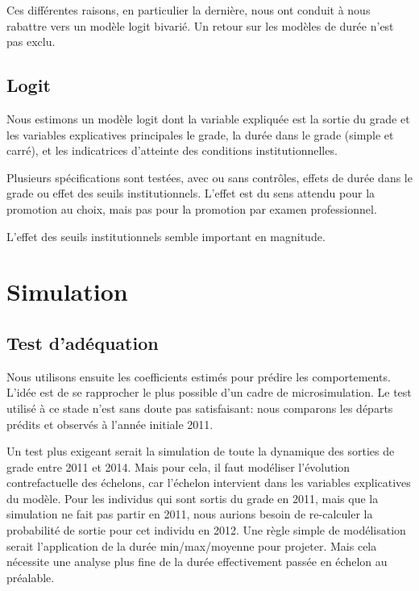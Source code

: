 \documentclass[11pt,a4paper]{article}
\begin{document}
Ces différentes raisons, en particulier la dernière, nous ont conduit à nous rabattre vers un modèle logit bivarié. Un retour sur les modèles de durée n'est pas exclu. 

\subsection*{Logit} 

Nous estimons un modèle logit dont la variable expliquée est la sortie du grade et les variables explicatives principales le grade, la durée dans le grade (simple et carré), et les indicatrices d'atteinte des conditions institutionnelles. 

Plusieurs spécifications sont testées, avec ou sans contrôles, effets de durée dans le grade ou effet des seuils institutionnels. 
L'effet est du sens attendu pour la promotion au choix, mais pas pour la promotion par examen professionnel. 

L'effet des seuils institutionnels semble important en magnitude.  %

\section{Simulation}


\subsection*{Test d'adéquation} 

Nous utilisons ensuite les coefficients estimés pour prédire les comportements. L'idée est de se rapprocher le plus possible d'un cadre de microsimulation. Le test utilisé à ce stade n'est sans doute pas satisfaisant: nous comparons les départs prédits et observés à l'année initiale 2011. 

Un test plus exigeant serait la simulation de toute la dynamique des sorties de grade entre 2011 et 2014. Mais pour cela, il faut modéliser l'évolution contrefactuelle des échelons, car l'échelon intervient dans les variables explicatives du modèle. Pour les individus qui sont sortis du grade en 2011, mais que la simulation ne fait pas partir en 2011, nous aurions besoin de re-calculer la probabilité de sortie pour cet individu en 2012. Une règle simple de modélisation serait l'application de la durée min/max/moyenne pour projeter. Mais cela nécessite une analyse plus fine de la durée effectivement passée en échelon au préalable. 
\end{document}
